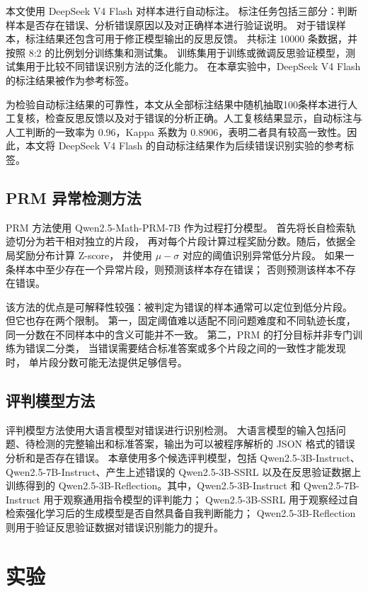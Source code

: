 本文使用 DeepSeek V4 Flash 对样本进行自动标注。
标注任务包括三部分：判断样本是否存在错误、分析错误原因以及对正确样本进行验证说明。
对于错误样本，标注结果还包含可用于修正模型输出的反思反馈。
共标注 10000 条数据，并按照 8:2 的比例划分训练集和测试集。
训练集用于训练或微调反思验证模型，测试集用于比较不同错误识别方法的泛化能力。
在本章实验中，DeepSeek V4 Flash 的标注结果被作为参考标签。

为检验自动标注结果的可靠性，本文从全部标注结果中随机抽取100条样本进行人工复核，检查反思反馈以及对于错误的分析正确。人工复核结果显示，自动标注与人工判断的一致率为 0.96，Kappa 系数为 0.8906，表明二者具有较高一致性。因此，本文将 DeepSeek V4 Flash 的自动标注结果作为后续错误识别实验的参考标签。

\subsection{PRM 异常检测方法}

PRM 方法使用 Qwen2.5-Math-PRM-7B 作为过程打分模型。
首先将长自检索轨迹切分为若干相对独立的片段，
再对每个片段计算过程奖励分数。随后，依据全局奖励分布计算 Z-score，
并使用 \(\mu-\sigma\) 对应的阈值识别异常低分片段。
如果一条样本中至少存在一个异常片段，则预测该样本存在错误；
否则预测该样本不存在错误。

该方法的优点是可解释性较强：被判定为错误的样本通常可以定位到低分片段。
但它也存在两个限制。
第一，固定阈值难以适配不同问题难度和不同轨迹长度，
同一分数在不同样本中的含义可能并不一致。
第二，PRM 的打分目标并非专门训练为错误二分类，
当错误需要结合标准答案或多个片段之间的一致性才能发现时，
单片段分数可能无法提供足够信号。

\subsection{评判模型方法}

评判模型方法使用大语言模型对错误进行识别检测。
大语言模型的输入包括问题、待检测的完整输出和标准答案，输出为可以被程序解析的 JSON 格式的错误分析和是否存在错误。
本章使用多个候选评判模型，包括 Qwen2.5-3B-Instruct、Qwen2.5-7B-Instruct、产生上述错误的 Qwen2.5-3B-SSRL
以及在反思验证数据上训练得到的 Qwen2.5-3B-Reflection。其中，Qwen2.5-3B-Instruct 和 Qwen2.5-7B-Instruct 用于观察通用指令模型的评判能力；
Qwen2.5-3B-SSRL 用于观察经过自检索强化学习后的生成模型是否自然具备自我判断能力；
Qwen2.5-3B-Reflection 则用于验证反思验证数据对错误识别能力的提升。

\section{实验}

